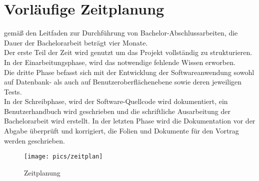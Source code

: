 \chapter{Vorläufige Zeitplanung}
gemäß den Leitfaden zur Durchführung von Bachelor-Abschlussarbeiten\cite{Boles:2015}, die Dauer der Bachelorarbeit beträgt vier Monate.\\
Der erste Teil der Zeit wird genutzt um das Projekt vollständig zu strukturieren. In der Einarbeitungsphase, wird das notwendige fehlende Wissen erworben.\\
Die dritte Phase befasst sich mit der Entwicklung der Softwareanwendung sowohl auf Datenbank- als auch auf Benutzeroberflächenebene sowie deren jeweiligen Tests.\\
In der Schreibphase, wird der Software-Quellcode wird dokumentiert, ein Benutzerhandbuch wird geschrieben und die schriftliche Ausarbeitung der Bachelorarbeit wird erstellt.
In der letzten Phase wird die Dokumentation vor der Abgabe überprüft und korrigiert, die Folien und Dokumente für den Vortrag werden geschrieben.

\begin{figure}[hp]%
    \centering
    \texttt{[image: pics/zeitplan]}\\
    \caption{Zeitplanung}
\end{figure}
